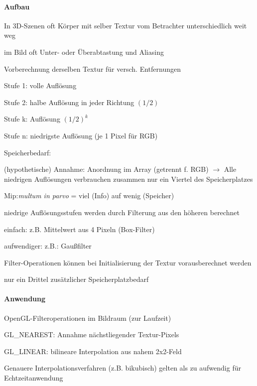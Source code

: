 \documentclass[landscape]{article}
\begin{document}
\begin{multicols}{3}
  \paragraph{Aufbau}
  \begin{itemize*}
    \item In 3D-Szenen oft Körper mit selber Textur vom Betrachter unterschiedlich weit weg 
    \item im Bild oft Unter- oder Überabtastung und Aliasing
    \item Vorberechnung derselben Textur für versch. Entfernungen
    \begin{itemize*}
    \item Stufe 1: volle Auflösung
    \item Stufe 2: halbe Auflösung in jeder Richtung $(1/2)$
    \item Stufe k: Auflösung $(1/2)^k$
    \item Stufe n: niedrigste Auflösung (je 1 Pixel für RGB)
    \end{itemize*}
    \item Speicherbedarf:
    \item (hypothetische) Annahme: Anordnung im Array (getrennt f. RGB) $\rightarrow$ Alle niedrigen Auflösungen verbrauchen zusammen nur ein Viertel des Speicherplatzes
    \item Mip:\textit{multum in parvo} = viel (Info) auf wenig (Speicher)
    \item niedrige Auflösungsstufen werden durch Filterung aus den höheren berechnet
    \begin{itemize*}
    \item einfach: z.B. Mittelwert aus 4 Pixeln (Box-Filter)
    \item aufwendiger: z.B.: Gaußfilter
    \end{itemize*}
    \item Filter-Operationen können bei Initialisierung der Textur vorausberechnet werden
    \item nur ein Drittel zusätzlicher Speicherplatzbedarf
  \end{itemize*}
  
  \paragraph{Anwendung}
  \begin{itemize*}
    \item OpenGL-Filteroperationen im Bildraum (zur Laufzeit)
    \item GL\_NEAREST: Annahme nächstliegender Textur-Pixels
    \item GL\_LINEAR: bilineare Interpolation aus nahem 2x2-Feld
    \item Genauere Interpolationsverfahren (z.B. bikubisch) gelten als zu aufwendig für Echtzeitanwendung
  \end{itemize*}
  

\end{multicols}
\end{document}
